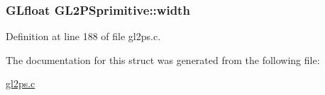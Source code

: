 \subsubsection[{width}]{\setlength{\rightskip}{0pt plus 5cm}G\+Lfloat G\+L2\+P\+Sprimitive\+::width}\label{struct_g_l2_p_sprimitive_aebf18baa0efe97f7e57bef844d998d76}


Definition at line 188 of file gl2ps.\+c.



The documentation for this struct was generated from the following file\+:\begin{DoxyCompactItemize}
\item 
\hyperlink{gl2ps_8c}{gl2ps.\+c}\end{DoxyCompactItemize}
